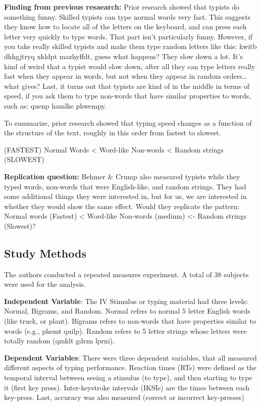 \documentclass[
]{book}
\begin{document}
\textbf{Finding from previous resaearch:} Prior research showed that typists do something funny. Skilled typists can type normal words very fast. This suggests they know how to locate all of the letters on the keyboard, and can press each letter very quickly to type words. That part isn't particularly funny. However, if you take really skilled typists and make them type random letters like this: kwitb dhhgjtryq xkldpt mazhyffdt, guess what happens? They slow down a lot. It's kind of weird that a typist would slow down, after all they can type letters really fast when they appear in words, but not when they appear in random orders\ldots what gives? Last, it turns out that typists are kind of in the middle in terms of speed, if you ask them to type non-words that have similar properties to words, such as: quenp hamlke phwempy.

To summarize, prior research showed that typing speed changes as a function of the structure of the text, roughly in this order from fastest to slowest.

(FASTEST) Normal Words \textless{} Word-like Non-words \textless{} Random strings (SLOWEST)

\textbf{Replication question:} Behmer \& Crump also measured typists while they typed words, non-words that were English-like, and random strings. They had some additional things they were interested in, but for us, we are interested in whether they would show the same effect. Would they replicate the pattern: Normal words (Fastest) \textless{} Word-like Non-words (medium) \textless- Random strings (Slowest)?

\hypertarget{study-methods-1}{%
\subsection{Study Methods}\label{study-methods-1}}

The authors conducted a repeated measures experiment. A total of 38 subjects were used for the analysis.

\textbf{Independent Variable}: The IV Stimulus or typing material had three levels: Normal, Bigrams, and Random. Normal refers to normal 5 letter English words (like truck, or plant). Bigrams refers to non-words that have properties similar to words (e.g., phemt quilp). Random refers to 5 letter strings whose letters were totally random (qmklt gdrzn lprni).

\textbf{Dependent Variables}: There were three dependent variables, that all measured different aspects of typing performance. Reaction times (RTs) were defined as the temporal interval between seeing a stimulus (to type), and then starting to type it (first key press). Inter-keystroke intervals (IKSIs) are the times between each key-press. Last, accuracy was also measured (correct or incorrect key-presses)
\end{document}
